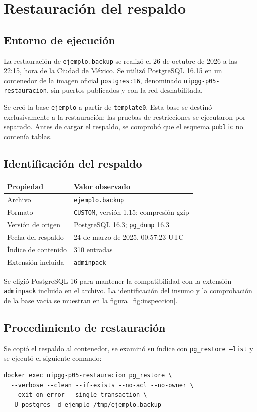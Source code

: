 \section{Restauración del respaldo}
\subsection{Entorno de ejecución}
La restauración de \texttt{ejemplo.backup} se realizó el 26 de octubre de
2026 a las 22:15, hora de la Ciudad de México. Se utilizó PostgreSQL 16.15
en un contenedor de la imagen oficial \texttt{postgres:16}, denominado
\texttt{nipgg-p05-restauracion}, sin puertos publicados y con la red
deshabilitada.

Se creó la base \texttt{ejemplo} a partir de \texttt{template0}. Esta base
se destinó exclusivamente a la restauración; las pruebas de restricciones
se ejecutaron por separado. Antes de cargar el respaldo, se comprobó que
el esquema \texttt{public} no contenía tablas.

\subsection{Identificación del respaldo}
\begingroup\small\renewcommand{\arraystretch}{1.4}
\begin{tabularx}{\linewidth}{@{}p{.30\linewidth}J@{}}
\toprule\textbf{Propiedad} & \textbf{Valor observado}\\\midrule
Archivo & \texttt{ejemplo.backup}\\
Formato & \texttt{CUSTOM}, versión 1.15; compresión gzip\\
Versión de origen & PostgreSQL 16.3; \texttt{pg\_dump} 16.3\\
Fecha del respaldo & 24 de marzo de 2025, 00:57:23 UTC\\
Índice de contenido & 310 entradas\\
Extensión incluida & \texttt{adminpack}\\\bottomrule
\end{tabularx}\endgroup

Se eligió PostgreSQL 16 para mantener la compatibilidad con la extensión
\texttt{adminpack} incluida en el archivo. La identificación del insumo y
la comprobación de la base vacía se muestran en la figura~\ref{fig:inspeccion}.

\subsection{Procedimiento de restauración}
Se copió el respaldo al contenedor, se examinó su índice con
\texttt{pg\_restore --list} y se ejecutó el siguiente comando:
\begin{lstlisting}[style=sqlacademico]
docker exec nipgg-p05-restauracion pg_restore \
  --verbose --clean --if-exists --no-acl --no-owner \
  --exit-on-error --single-transaction \
  -U postgres -d ejemplo /tmp/ejemplo.backup
\end{lstlisting}

